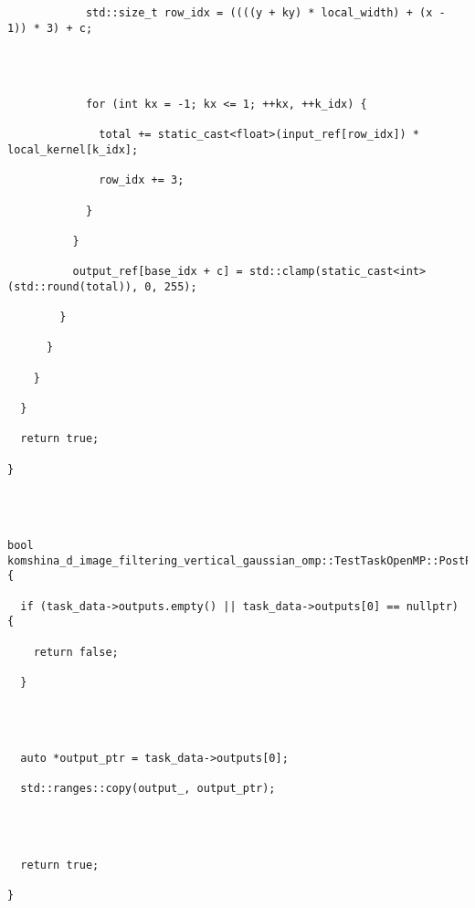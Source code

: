 \documentclass[12pt]{article}
\begin{document}
\begin{lstlisting}
            std::size_t row_idx = ((((y + ky) * local_width) + (x - 1)) * 3) + c;




            for (int kx = -1; kx <= 1; ++kx, ++k_idx) {

              total += static_cast<float>(input_ref[row_idx]) * local_kernel[k_idx];

              row_idx += 3;

            }

          }

          output_ref[base_idx + c] = std::clamp(static_cast<int>(std::round(total)), 0, 255);

        }

      }

    }

  }

  return true;

}




bool komshina_d_image_filtering_vertical_gaussian_omp::TestTaskOpenMP::PostProcessingImpl() {

  if (task_data->outputs.empty() || task_data->outputs[0] == nullptr) {

    return false;

  }




  auto *output_ptr = task_data->outputs[0];

  std::ranges::copy(output_, output_ptr);




  return true;

}
\end{lstlisting}
\end{document}
